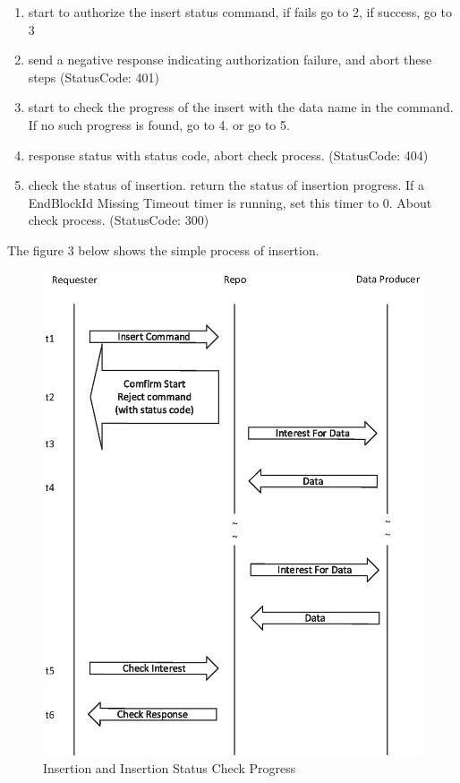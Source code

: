 \documentclass{acm_proc_article-sp}
\begin{document}
\begin{enumerate}[step 1]

\item start to authorize the insert status command, if fails go to 2, if success, go to 3

\item send a negative response indicating authorization failure, and abort these steps (StatusCode: 401)

\item start to check the progress of the insert with the data name in the command. If no such progress is found, go to 4. or go to 5.

\item response status with status code, abort check process. (StatusCode: 404)

\item check the status of insertion. return the status of insertion progress. If a EndBlockId Missing Timeout timer is running, set this timer to 0. About check process. (StatusCode: 300)

\end{enumerate}

The figure 3 below shows the simple process of insertion.

\begin{figure}
\centering
\includegraphics{Drawing3.eps}
\caption{Insertion and Insertion Status Check Progress}
\end{figure}
\end{document}
